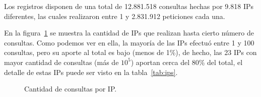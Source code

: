 Los registros disponen de una total de 12.881.518 consultas hechas por 9.818 IPs
diferentes, las cuales realizaron entre 1 y 2.831.912 peticiones cada una.

En la figura~\ref{fig:ips} se muestra la cantidad de IPs que realizan hasta
cierto número de consultas.
Como podemos ver en ella, la mayoría de las IPs efectuó entre 1 y 100 consultas,
pero su aporte al total es bajo (menos de 1\%), de hecho, las 23 IPs con mayor
cantidad de consultas (más de $10^5$) aportan cerca del 80\% del total, el
detalle de estas IPs puede ser visto en la tabla~\ref{tab:ips}.

\begin{figure}[ht]
  \caption{Cantidad de consultas por IP.}\label{fig:ips}
\end{figure}

